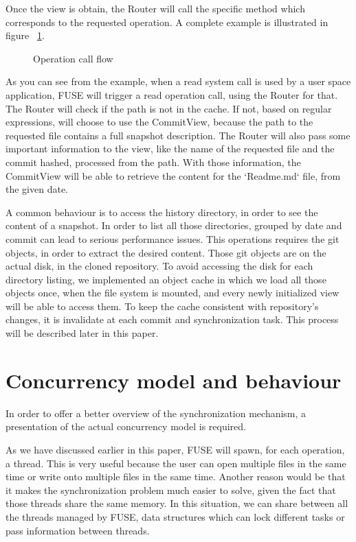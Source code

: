 Once the view is obtain, the Router will call the specific method which corresponds to the requested operation. A complete example is illustrated in figure ~\ref{fig:routing}.

\begin{figure}[h]
  \begin{center}
    \def\svgwidth{\columnwidth}
    
  \end{center}
  \caption{Operation call flow}
  \label{fig:routing}
\end{figure}

As you can see from the example, when a read system call is used by a user space application, FUSE will trigger a read operation call, using the Router for that. The Router will check if the path is not in the cache. If not, based on regular expressions, will choose to use the CommitView, because the path to the requested file contains a full snapshot description. The Router will also pass some important information to the view, like the name of the requested file and the commit hashed, processed from the path. With those information, the CommitView will be able to retrieve the content for the `Readme.md` file, from the given date.

A common behaviour is to access the history directory, in order to see the content of a snapshot. In order to list all those directories, grouped by date and commit can lead to serious performance issues. This operations requires the git objects, in order to extract the desired content. Those git objects are on the actual disk, in the cloned repository. To avoid accessing the disk for each directory listing, we implemented an object cache in which we load all those objects once, when the file system is mounted, and every newly initialized view will be able to access them. To keep the cache consistent with repository's changes, it is invalidate at each commit and synchronization task. This process will be described later in this paper.

\section{Concurrency model and behaviour}
In order to offer a better overview of the synchronization mechanism, a presentation of the actual concurrency model is required.

As we have discussed earlier in this paper, FUSE will spawn, for each operation, a thread. This is very useful because the user can open multiple files in the same time or write onto multiple files in the same time. Another reason would be that it makes the synchronization problem much easier to solve, given the fact that those threads share the same memory. In this situation, we can share between all the threads managed by FUSE, data structures which can lock different tasks or pass information between threads.

